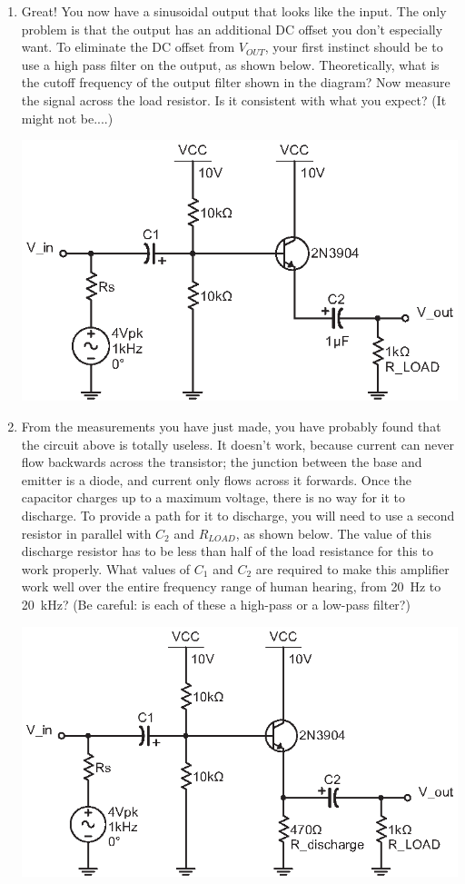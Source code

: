 \begin{enumerate}[wide]
\pagebreak[3]
\item Great!  You now have a sinusoidal output that looks like the input.  The only problem is that the output has an additional DC offset you don't especially want.  To eliminate the DC offset from $V_{OUT}$, your first instinct should be to use a high pass filter on the output, as shown below.  Theoretically, what is the cutoff frequency of the output filter shown in the diagram?  Now measure the signal across the load resistor.  Is it consistent with what you expect?  (It might not be....)
\begin{center}
\includegraphics{bjt/biased_output_and_input_incorrect.eps}
\end{center}

\item From the measurements you have just made, you have probably found that the circuit above is totally useless.  It doesn't work, because current can never flow backwards across the transistor; the junction between the base and emitter is a diode, and current only flows across it forwards. Once the capacitor charges up to a maximum voltage, there is no way for it to discharge.  To provide a path for it to discharge, you will need to use a second resistor in parallel with $C_2$ and $R_{LOAD}$, as shown below.  The value of this discharge resistor has to be less than half of the load resistance for this to work properly.  What values of $C_1$ and $C_2$ are required to make this amplifier work well over the entire frequency range of human hearing, from 20~Hz to 20~kHz?  (Be careful: is each of these a high-pass or a low-pass filter?)
\begin{center}
\includegraphics{bjt/biased_output_and_input_correct.eps}
\end{center}


\end{enumerate}
